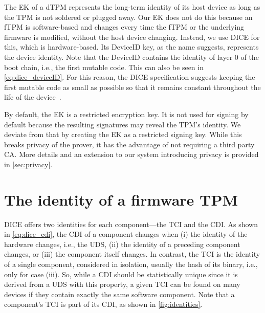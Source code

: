 The \ac{EK} of a \ac{dTPM} represents the long-term identity of its host device as long as the \ac{TPM} is not soldered or plugged away.
Our \ac{EK} does not do this because an \ac{fTPM} is software-based and changes every time the \ac{fTPM} or the underlying firmware is modified, without the host device changing.
Instead, we use \ac{DICE} for this, which is hardware-based.
Its DeviceID key, as the name suggests, represents the device identity.
Note that the DeviceID contains the identity of layer 0 of the boot chain, i.e., the first mutable code.
This can also be seen in \autoref{eq:dice_deviceID}.
For this reason, the DICE specification suggests keeping the first mutable code as small as possible so that it remains constant throughout the life of the device~\cite{dice-layering-arch}.


By default, the \ac{EK} is a restricted encryption key.
It is not used for signing by default because the resulting signatures may reveal the TPM's identity.
We deviate from that by creating the \ac{EK} as a restricted signing key.
While this breaks privacy of the prover, it has the advantage of not requiring a third party \ac{CA}\@.
More details and an extension to our system introducing privacy is provided in \autoref{sec:privacy}.

\section{The identity of a firmware TPM}

DICE offers two identities for each component---the TCI and the CDI\@.
As shown in \autoref{eq:dice_cdi}, the CDI of a component changes when (i) the identity of the hardware changes, i.e., the \ac{UDS}, (ii) the identity of a preceding component changes, or (iii) the component itself changes.
In contrast, the TCI is the identity of a single component, considered in isolation, usually the hash of its binary, i.e., only for case (iii).
So, while a CDI should be statistically unique since it is derived from a \ac{UDS} with this property, a given TCI can be found on many devices if they contain exactly the same software component.
Note that a component's TCI is part of its CDI, as shown in \autoref{fig:identities}.



